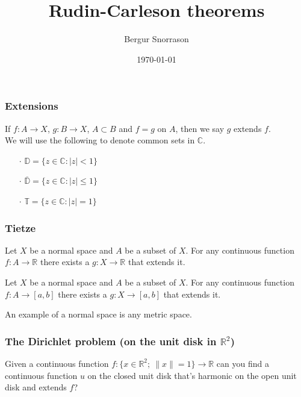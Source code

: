\documentclass{beamer}
\title{Rudin-Carleson theorems}
\author{Bergur Snorrason}
\date{\today}
\begin{document}
\frame{\titlepage}

\begin{frame}
	\frametitle{Extensions}
\begin{definition}
If $f \colon A \rightarrow X$, $g \colon B \rightarrow X$, $A \subset B$ and $f = g$ on $A$, then we say $g$ extends $f$. \\
We will use the following to denote common sets in $\mathbb{C}$.
\begin{enumerate}
\item[$\cdot$] $\mathbb{D} = \{z \in \mathbb{C} \colon |z| < 1\}$
\item[$\cdot$] $\overline{\mathbb{D}} = \{z \in \mathbb{C} \colon |z| \leq 1\}$
\item[$\cdot$] $\mathbb{T} = \{z \in \mathbb{C} \colon |z| = 1\}$
\end{enumerate}
\end{definition}
\end{frame}

\begin{frame}
	\frametitle{Tietze}
\begin{theorem}[Tietze]
Let $X$ be a normal space and $A$ be a subset of $X$.
For any continuous function $f \colon A \rightarrow \mathbb{R}$ there exists a $g \colon X \rightarrow \mathbb{R}$ that extends it.
\end{theorem}
\begin{theorem}[Tietze]
Let $X$ be a normal space and $A$ be a subset of $X$.
For any continuous function $f \colon A \rightarrow [a, b]$ there exists a $g \colon X \rightarrow [a, b]$ that extends it.
\end{theorem}
An example of a normal space is any metric space.
\end{frame}


\begin{frame}
	\frametitle{The Dirichlet problem (on the unit disk in $\mathbb{R}^2$)}
Given a continuous function $f \colon \{x \in \mathbb{R}^2;\ \|x\| = 1\} \rightarrow \mathbb{R}$ can you find a continuous function $u$ on the closed unit disk that's harmonic on the open unit disk and extends $f$?
\end{frame}
\end{document}
